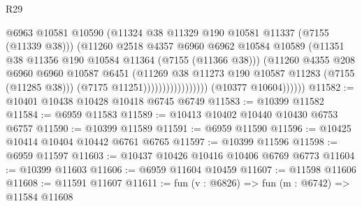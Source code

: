 \begin{lexlean}{R29}
\begin{coremodule}
                                          @6963
                                          @10581
                                          @10590
                                          (@11324
                                            @38
                                            @11329
                                            @190
                                            @10581
                                            @11337
                                            (@7155 (@11339 @38)))
                                          (@11260
                                            @2518
                                            @4357
                                            @6960
                                            @6962
                                            @10584
                                            @10589
                                            (@11351
                                              @38
                                              @11356
                                              @190
                                              @10584
                                              @11364
                                              (@7155 (@11366 @38)))
                                            (@11260
                                              @4355
                                              @208
                                              @6960
                                              @6960
                                              @10587
                                              @6451
                                              (@11269
                                                @38
                                                @11273
                                                @190
                                                @10587
                                                @11283
                                                (@7155 (@11285 @38)))
                                              (@7175 @11251)))))))))))))))))
              (@10377 @10604))))))
@11582 := @10401 @10438 @10428 @10418 @6745 @6749
@11583 := @10399 @11582
@11584 := @6959 @11583
@11589 := @10413 @10402 @10440 @10430 @6753 @6757
@11590 := @10399 @11589
@11591 := @6959 @11590
@11596 := @10425 @10414 @10404 @10442 @6761 @6765
@11597 := @10399 @11596
@11598 := @6959 @11597
@11603 := @10437 @10426 @10416 @10406 @6769 @6773
@11604 := @10399 @11603
@11606 := @6959 @11604 @10459
@11607 := @11598 @11606
@11608 := @11591 @11607
@11611 := fun (v : @6826) => fun (m : @6742) => @11584 @11608

\end{coremodule}
\end{lexlean}
